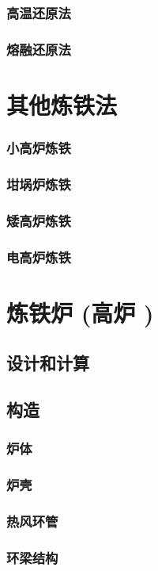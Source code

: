 \documentclass[UTF8]{../../ApplicationUniverse}
\begin{document}
    \subsubsection{高温还原法}
    \subsubsection{熔融还原法}
\section{其他炼铁法}
    \subsubsection{小高炉炼铁}
    \subsubsection{坩埚炉炼铁}
    \subsubsection{矮高炉炼铁}
    \subsubsection{电高炉炼铁}
\section{炼铁炉 (高炉 )}
    \subsection{设计和计算}
    \subsection{构造}
        \subsubsection{炉体}
        \subsubsection{炉壳}
        \subsubsection{热风环管}
        \subsubsection{环梁结构}
\end{document}
